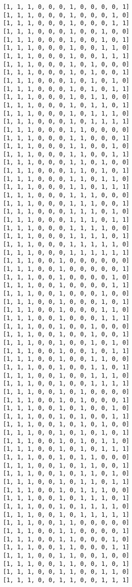 \documentclass[11pt]{article}
\begin{document}
\begin{Verbatim}[commandchars=\\\{\}]
[1, 1, 1, 0, 0, 0, 1, 0, 0, 0, 0, 1]
[1, 1, 1, 0, 0, 0, 1, 0, 0, 0, 1, 0]
[1, 1, 1, 0, 0, 0, 1, 0, 0, 0, 1, 1]
[1, 1, 1, 0, 0, 0, 1, 0, 0, 1, 0, 0]
[1, 1, 1, 0, 0, 0, 1, 0, 0, 1, 0, 1]
[1, 1, 1, 0, 0, 0, 1, 0, 0, 1, 1, 0]
[1, 1, 1, 0, 0, 0, 1, 0, 0, 1, 1, 1]
[1, 1, 1, 0, 0, 0, 1, 0, 1, 0, 0, 0]
[1, 1, 1, 0, 0, 0, 1, 0, 1, 0, 0, 1]
[1, 1, 1, 0, 0, 0, 1, 0, 1, 0, 1, 0]
[1, 1, 1, 0, 0, 0, 1, 0, 1, 0, 1, 1]
[1, 1, 1, 0, 0, 0, 1, 0, 1, 1, 0, 0]
[1, 1, 1, 0, 0, 0, 1, 0, 1, 1, 0, 1]
[1, 1, 1, 0, 0, 0, 1, 0, 1, 1, 1, 0]
[1, 1, 1, 0, 0, 0, 1, 0, 1, 1, 1, 1]
[1, 1, 1, 0, 0, 0, 1, 1, 0, 0, 0, 0]
[1, 1, 1, 0, 0, 0, 1, 1, 0, 0, 0, 1]
[1, 1, 1, 0, 0, 0, 1, 1, 0, 0, 1, 0]
[1, 1, 1, 0, 0, 0, 1, 1, 0, 0, 1, 1]
[1, 1, 1, 0, 0, 0, 1, 1, 0, 1, 0, 0]
[1, 1, 1, 0, 0, 0, 1, 1, 0, 1, 0, 1]
[1, 1, 1, 0, 0, 0, 1, 1, 0, 1, 1, 0]
[1, 1, 1, 0, 0, 0, 1, 1, 0, 1, 1, 1]
[1, 1, 1, 0, 0, 0, 1, 1, 1, 0, 0, 0]
[1, 1, 1, 0, 0, 0, 1, 1, 1, 0, 0, 1]
[1, 1, 1, 0, 0, 0, 1, 1, 1, 0, 1, 0]
[1, 1, 1, 0, 0, 0, 1, 1, 1, 0, 1, 1]
[1, 1, 1, 0, 0, 0, 1, 1, 1, 1, 0, 0]
[1, 1, 1, 0, 0, 0, 1, 1, 1, 1, 0, 1]
[1, 1, 1, 0, 0, 0, 1, 1, 1, 1, 1, 0]
[1, 1, 1, 0, 0, 0, 1, 1, 1, 1, 1, 1]
[1, 1, 1, 0, 0, 1, 0, 0, 0, 0, 0, 0]
[1, 1, 1, 0, 0, 1, 0, 0, 0, 0, 0, 1]
[1, 1, 1, 0, 0, 1, 0, 0, 0, 0, 1, 0]
[1, 1, 1, 0, 0, 1, 0, 0, 0, 0, 1, 1]
[1, 1, 1, 0, 0, 1, 0, 0, 0, 1, 0, 0]
[1, 1, 1, 0, 0, 1, 0, 0, 0, 1, 0, 1]
[1, 1, 1, 0, 0, 1, 0, 0, 0, 1, 1, 0]
[1, 1, 1, 0, 0, 1, 0, 0, 0, 1, 1, 1]
[1, 1, 1, 0, 0, 1, 0, 0, 1, 0, 0, 0]
[1, 1, 1, 0, 0, 1, 0, 0, 1, 0, 0, 1]
[1, 1, 1, 0, 0, 1, 0, 0, 1, 0, 1, 0]
[1, 1, 1, 0, 0, 1, 0, 0, 1, 0, 1, 1]
[1, 1, 1, 0, 0, 1, 0, 0, 1, 1, 0, 0]
[1, 1, 1, 0, 0, 1, 0, 0, 1, 1, 0, 1]
[1, 1, 1, 0, 0, 1, 0, 0, 1, 1, 1, 0]
[1, 1, 1, 0, 0, 1, 0, 0, 1, 1, 1, 1]
[1, 1, 1, 0, 0, 1, 0, 1, 0, 0, 0, 0]
[1, 1, 1, 0, 0, 1, 0, 1, 0, 0, 0, 1]
[1, 1, 1, 0, 0, 1, 0, 1, 0, 0, 1, 0]
[1, 1, 1, 0, 0, 1, 0, 1, 0, 0, 1, 1]
[1, 1, 1, 0, 0, 1, 0, 1, 0, 1, 0, 0]
[1, 1, 1, 0, 0, 1, 0, 1, 0, 1, 0, 1]
[1, 1, 1, 0, 0, 1, 0, 1, 0, 1, 1, 0]
[1, 1, 1, 0, 0, 1, 0, 1, 0, 1, 1, 1]
[1, 1, 1, 0, 0, 1, 0, 1, 1, 0, 0, 0]
[1, 1, 1, 0, 0, 1, 0, 1, 1, 0, 0, 1]
[1, 1, 1, 0, 0, 1, 0, 1, 1, 0, 1, 0]
[1, 1, 1, 0, 0, 1, 0, 1, 1, 0, 1, 1]
[1, 1, 1, 0, 0, 1, 0, 1, 1, 1, 0, 0]
[1, 1, 1, 0, 0, 1, 0, 1, 1, 1, 0, 1]
[1, 1, 1, 0, 0, 1, 0, 1, 1, 1, 1, 0]
[1, 1, 1, 0, 0, 1, 0, 1, 1, 1, 1, 1]
[1, 1, 1, 0, 0, 1, 1, 0, 0, 0, 0, 0]
[1, 1, 1, 0, 0, 1, 1, 0, 0, 0, 0, 1]
[1, 1, 1, 0, 0, 1, 1, 0, 0, 0, 1, 0]
[1, 1, 1, 0, 0, 1, 1, 0, 0, 0, 1, 1]
[1, 1, 1, 0, 0, 1, 1, 0, 0, 1, 0, 0]
[1, 1, 1, 0, 0, 1, 1, 0, 0, 1, 0, 1]
[1, 1, 1, 0, 0, 1, 1, 0, 0, 1, 1, 0]
[1, 1, 1, 0, 0, 1, 1, 0, 0, 1, 1, 1]

\end{Verbatim}
\end{document}

